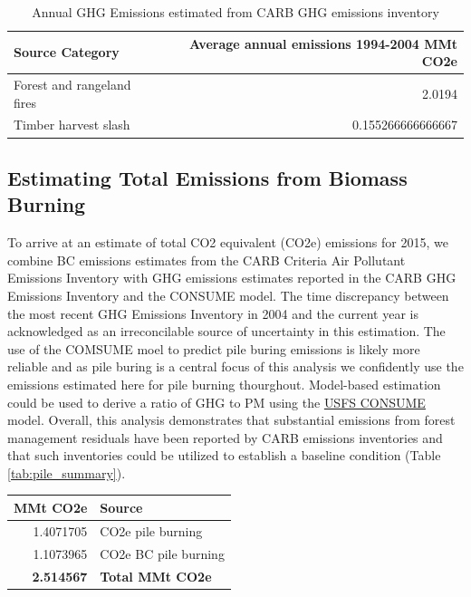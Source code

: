 \documentclass[a4paper]{article}
\begin{document}
\begin{table}[htb]
\centering
\begin{tabular}{lr}
Source Category & Average annual emissions 1994-2004 MMt CO2e\\
\hline
Forest and rangeland fires & 2.0194\\
Timber harvest slash & 0.155266666666667\\
\end{tabular}
\caption{Annual \ac{GHG} Emissions estimated from CARB \ac{GHG} emissions inventory \label{arb_ghg_2004}}

\end{table}

\subsection{Estimating Total Emissions from Biomass Burning}
\label{sec:orgheadline6}
To arrive at an estimate of total CO2 equivalent (CO2e) emissions for 2015, 
we combine \ac{BC} emissions estimates from the \ac{CARB}
Criteria Air Pollutant Emissions Inventory with GHG emissions estimates reported in the
CARB GHG Emissions Inventory and the CONSUME model. The time discrepancy between the most recent GHG Emissions Inventory in 2004 and the current year is
acknowledged as an irreconcilable source of uncertainty in this
estimation. The use of the COMSUME moel to predict pile buring emissions is likely more reliable and as pile buring is a central focus of this analysis we confidently use the emissions estimated here for pile burning thourghout. Model-based estimation could be used to derive a ratio of \ac{GHG} to PM using the \href{http://www.fs.fed.us/pnw/fera/research/smoke/consume/index.shtml}{USFS CONSUME} model. Overall, this analysis demonstrates that substantial emissions from forest management residuals have been reported by CARB emissions inventories and that such inventories could be utilized to establish a baseline condition (Table \ref{tab:pile_summary}).

\begin{center}
\begin{tabular}{rl}
MMt CO2e & Source\\
\hline
1.4071705 & CO2e pile burning\\
1.1073965 & CO2e BC pile burning\\
\hline
\textbf{2.514567} & \textbf{Total MMt CO2e}\\
\end{tabular}
\label{tab:orgtable4}


\end{center}
\end{document}
